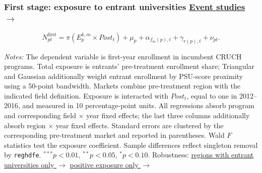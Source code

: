 \documentclass{beamer}
\begin{document}
\begin{frame}[label=sua-first-stage]

\frametitle{
    First stage: exposure to entrant universities
    \hfill
    \hyperlink{sua-event-studies}{
        \scriptsize\color{blue}
        Event studies $\rightarrow$
    }
}

\centering

\begin{equation*}
N^{\mathrm{first}}_{pt}
=
\pi
\left(
E^{k,m}_{p}\times Post_t
\right)
+\mu_p
+\alpha_{f_m(p),t}
+\gamma_{r(p),t}
+\nu_{pt}.
\end{equation*}

\vspace{-0.15cm}

\scriptsize

\resizebox{0.7\textwidth}{!}{%
%
}

\vspace{0.08cm}

\parbox{0.97\textwidth}{%
\tiny
\textit{Notes:}
The dependent variable is first-year enrollment in incumbent CRUCH programs.
Total exposure is entrants' pre-treatment enrollment share; Triangular and
Gaussian additionally weight entrant enrollment by PSU-score proximity using
a 50-point bandwidth. Markets combine pre-treatment region with the indicated
field definition. Exposure is interacted with $Post_t$, equal to one in
2012--2016, and measured in 10 percentage-point units. All regressions absorb
program and corresponding field $\times$ year fixed effects; the last three
columns additionally absorb region $\times$ year fixed effects. Standard
errors are clustered by the corresponding pre-treatment market and reported
in parentheses. Wald $F$ statistics test the exposure coefficient. Sample
differences reflect singleton removal by \texttt{reghdfe}.
$^{***}p<0.01$, $^{**}p<0.05$, $^{*}p<0.10$.
Robustness: \hyperlink{sua-fs-lvl-entrant}{\color{blue}regions with entrant
universities only $\rightarrow$} \quad
\hyperlink{sua-fs-lvl-positive}{\color{blue}positive exposure only $\rightarrow$}
}

\end{frame}
\end{document}
